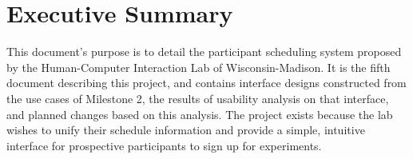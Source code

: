 \newcommand{\puttitle}{Milestone 5}


\section{Executive Summary}
This document's purpose is to detail the participant scheduling system proposed by the  Human-Computer Interaction Lab of Wisconsin-Madison. It is the fifth document describing this project, and contains interface designs constructed from the use cases of Milestone 2, the results of usability analysis on that interface, and planned changes based on this analysis. The project exists because the lab wishes to unify their schedule information and provide a simple, intuitive interface for prospective participants to sign up for experiments.










